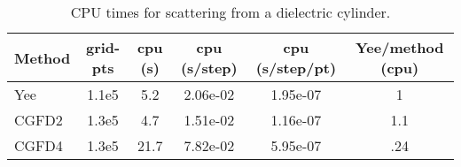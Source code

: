 \documentclass[11pt]{article}
\begin{document}
\begin{table}[hbt]
\begin{center}
\begin{tabular}{|l|c|c|c|c|c|}\hline
Method  & grid-pts  & cpu (s)      & cpu (s/step) & cpu (s/step/pt) &  Yee/method (cpu) \\ \hline
Yee     &  1.1e5    &   5.2        &  2.06e-02    &  1.95e-07     &     1    \\
CGFD2   &  1.3e5    &    4.7       &  1.51e-02    &  1.16e-07     &     1.1   \\
CGFD4   &  1.3e5    &   21.7       &  7.82e-02    &  5.95e-07     &     .24  \\ \hline
\end{tabular}
\end{center}
\caption{ CPU times for scattering from a dielectric cylinder.}\label{tab:dielectricCylCPU}
\end{table}


\clearpage





% 

\clearpage







\end{document}
